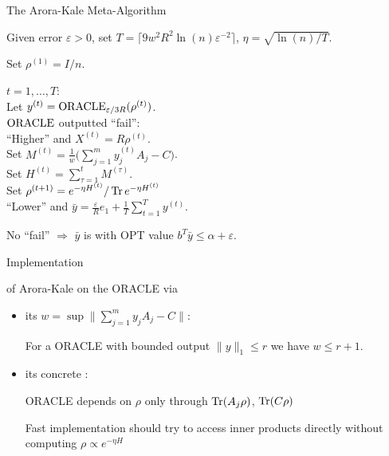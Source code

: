 \begin{frame}{The Arora-Kale Meta-Algorithm}

 Given error $\varepsilon>0$, set $T=\lceil 9 w^2 R^2 \ln(n) \varepsilon^{-2} \rceil$, $\eta=\sqrt{\ln(n)/T}$.
 
 \vspace{\floatsep}
 
 Set $\rho^{(1)}=I/n$.
 
 \vspace{0.25\floatsep}
 
  $t=1,\dots,T$: \\[0.2\floatsep]
 \quad Let $y^{(t)} = \operatorname{ORACLE}_{\varepsilon/3R}(\rho^{(t)})$. \\[0.2\floatsep]
 \quad {} $\operatorname{ORACLE}$ outputted ``fail'': \\[0.2\floatsep]
 \quad \quad {} ``Higher'' and $X^{(t)} = R\rho^{(t)}$. \\[0.2\floatsep]
 \quad Set $M^{(t)} = \frac{1}{w} \big( \sum_{j=1}^m y^{(t)}_j A_j - C \big)$. \\[0.2\floatsep]
 \quad Set $H^{(t)} = \sum_{\tau=1}^t M^{(\tau)}$. \\[0.2\floatsep]
 \quad Set $\rho^{(t+1)} = e^{-\eta H^{(t)}}/\operatorname{Tr} e^{-\eta H^{(t)}}$ \\[0.2\floatsep]
  ``Lower'' and $\bar y = \frac{\varepsilon}{R} e_1 + \frac{1}{T}\sum_{t=1}^T y^{(t)}$.

 \vspace{2\floatsep}
 
 No ``fail'' $\Rightarrow$ $\bar y$ is  with OPT value $b^T\bar{y} \leq \alpha + \varepsilon$.
 
\end{frame}



\begin{frame}{Implementation}
 
  of Arora-Kale  on the ORACLE via
 \begin{itemize}
  \item its  $w = \sup \| \sum_{j=1}^m y_j A_j - C  \|$:
  
    \vspace{0.25\floatsep}
  
    For a ORACLE with bounded output $\|y\|_1 \leq r$ we have $w \leq r + 1$.
  
  \item its concrete :
  
   \vspace{0.5\floatsep}
   
   ORACLE depends on $\rho$ only through $\operatorname{Tr}(A_j \rho)$, $\operatorname{Tr}(C\rho)$
   
   \vspace{0.5\floatsep}
   
   Fast implementation should try to access inner products directly without computing $\rho \propto e^{-\eta H}$   
  
 \end{itemize}

\end{frame}
